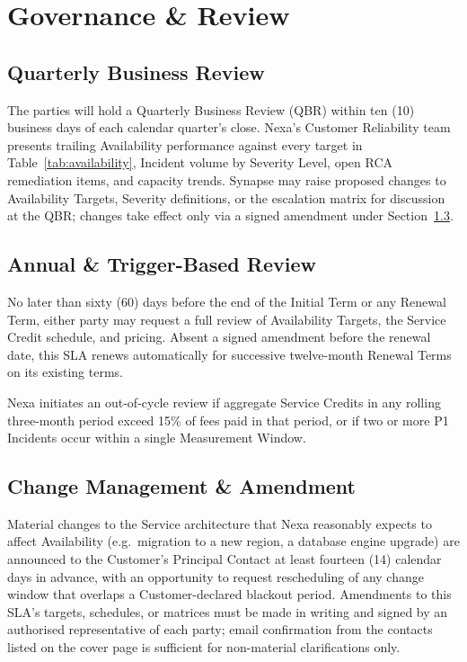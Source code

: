 
\section{Governance \& Review}
\label{sec:governance}

\subsection{Quarterly Business Review}

The parties will hold a Quarterly Business Review (QBR) within ten (10) business days of
each calendar quarter's close. Nexa's Customer Reliability team presents trailing
Availability performance against every target in Table~\ref{tab:availability}, Incident
volume by Severity Level, open RCA remediation items, and capacity trends. Synapse may
raise proposed changes to Availability Targets, Severity definitions, or the escalation
matrix for discussion at the QBR; changes take effect only via a signed amendment under
Section~\ref{sec:amendment}.

\subsection{Annual \& Trigger-Based Review}

 No later than sixty (60) days before the end of the Initial Term or
any Renewal Term, either party may request a full review of Availability Targets, the
Service Credit schedule, and pricing. Absent a signed amendment before the renewal date,
this SLA renews automatically for successive twelve-month Renewal Terms on its existing
terms.

 Nexa initiates an out-of-cycle review if aggregate Service
Credits in any rolling three-month period exceed 15\% of fees paid in that period, or if
two or more P1 Incidents occur within a single Measurement Window.

\subsection{Change Management \& Amendment}
\label{sec:amendment}

Material changes to the Service architecture that Nexa reasonably expects to affect
Availability (e.g.\ migration to a new region, a database engine upgrade) are announced
to the Customer's Principal Contact at least fourteen (14) calendar days in advance,
with an opportunity to request rescheduling of any change window that overlaps a
Customer-declared blackout period. Amendments to this SLA's targets, schedules, or
matrices must be made in writing and signed by an authorised representative of each
party; email confirmation from the contacts listed on the cover page is sufficient for
non-material clarifications only.

